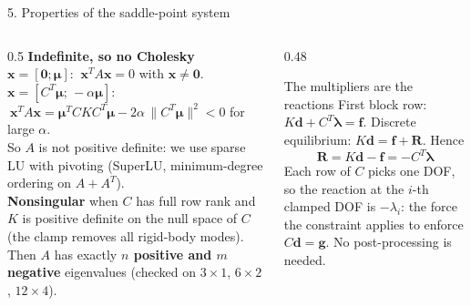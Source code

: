\documentclass[aspectratio=169,10pt]{beamer}
\newcommand{\vd}{\mathbf d}
\newcommand{\vf}{\mathbf f}
\newcommand{\vg}{\mathbf g}
\newcommand{\vR}{\mathbf R}
\newcommand{\vlam}{\bm{\lambda}}
\newcommand{\vmu}{\bm{\mu}}
\begin{document}
\begin{frame}{5. Properties of the saddle-point system}
  \begin{columns}[T]
    \begin{column}{0.5\textwidth}
      \textbf{Indefinite, so no Cholesky}\\[2pt]
      $\mathbf x=[\mathbf 0;\vmu]$: $\ \mathbf x^TA\mathbf x=0$ with $\mathbf x\ne\mathbf 0$.\\
      $\mathbf x=[C^T\vmu;\,-\alpha\vmu]$: $\ \mathbf x^TA\mathbf x=\vmu^TCKC^T\vmu-2\alpha\,\|C^T\vmu\|^2<0$
      for large $\alpha$.\\[3pt]
      So $A$ is not positive definite: we use sparse LU with pivoting
      (SuperLU, minimum-degree ordering on $A+A^T$).\\[6pt]
      \textbf{Nonsingular} when $C$ has full row rank and $K$ is positive definite on the null space of
      $C$ (the clamp removes all rigid-body modes). Then $A$ has exactly \textbf{$n$ positive and $m$ negative}
      eigenvalues (checked on $3\times1$, $6\times2$, $12\times4$).
    \end{column}
    \begin{column}{0.48\textwidth}
      \begin{block}{The multipliers are the reactions}
        First block row: $K\vd+C^T\vlam=\vf$. Discrete equilibrium: $K\vd=\vf+\vR$. Hence
        \[
          \boxed{\vR=K\vd-\vf=-C^T\vlam}
        \]
        Each row of $C$ picks one DOF, so the reaction at the $i$-th clamped DOF is $-\lambda_i$:
        the force the constraint applies to enforce $C\vd=\vg$.
        No post-processing is needed.
      \end{block}
    \end{column}
  \end{columns}
\end{frame}
\end{document}
